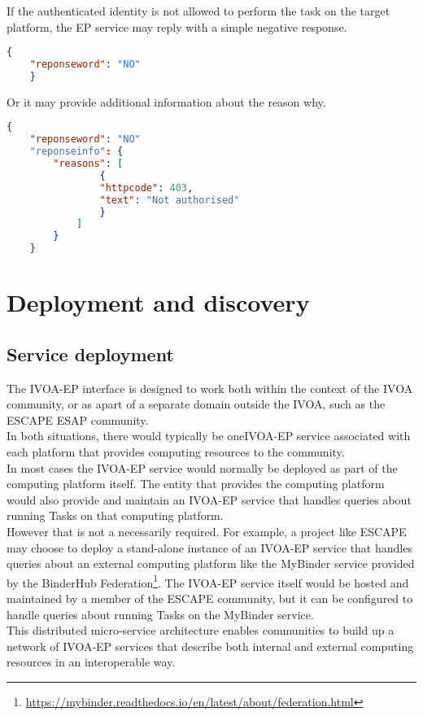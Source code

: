 \documentclass[11pt,a4paper]{ivoa}
\newcommand{\ivoep} {IVOA-EP\xspace}
\newcommand{\footurl}[1] {\footnote{\url{#1}}}
\begin{document}
If the authenticated identity is not allowed to perform the task on the target platform, the EP service may
reply with a simple negative response.
\begin{lstlisting}[language=json]
    {
    "reponseword": "NO"
    }
\end{lstlisting}
Or it may provide additional information about the reason why.
\begin{lstlisting}[language=json]
    {
    "reponseword": "NO"
    "reponseinfo": {
        "reasons": [
                {
                "httpcode": 403,
                "text": "Not authorised"
                }
            ]
        }
    }
\end{lstlisting}

\section{Deployment and discovery}
\label{sec:deployment-discovery}

\subsection{Service deployment}
\label{sec:service-deployment}
The \ivoep interface is designed to work both within the context of the IVOA community, or as apart of a separate domain outside the IVOA, such as the ESCAPE ESAP community.
\\
In both situations, there would typically be one\ivoep service associated with each platform that provides computing resources to the community.
\\
In most cases the \ivoep service would normally be deployed as part of the computing platform itself.
The entity that provides the computing platform would also provide and maintain an \ivoep service that handles queries about running Tasks on that computing platform.
\\
However that is not a necessarily required.
For example, a project like ESCAPE may choose to deploy a stand-alone instance of an \ivoep service that handles queries about an external computing platform like the MyBinder service provided by the BinderHub Federation\footurl{https://mybinder.readthedocs.io/en/latest/about/federation.html}.
The \ivoep service itself would be hosted and maintained by a member of the ESCAPE community, but it can be configured to handle queries about running Tasks on the MyBinder service.
\\
This distributed micro-service architecture enables communities to build up a network of \ivoep services that describe both internal and external computing resources in an interoperable way.
\\
\end{document}
